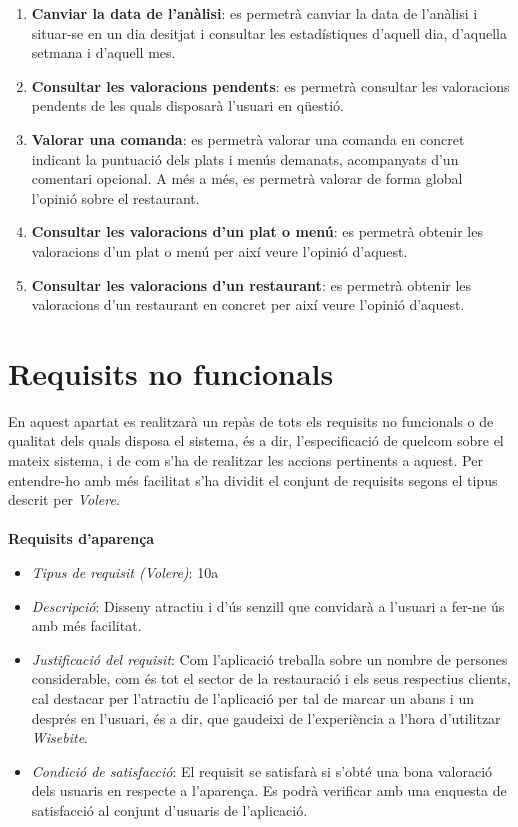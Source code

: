 \begin{enumerate}
\item \textbf{Canviar la data de l'anàlisi}: es permetrà canviar la data de l'anàlisi i situar-se en un dia desitjat i consultar les estadístiques d'aquell dia, d'aquella setmana i d'aquell mes.
\item \textbf{Consultar les valoracions pendents}: es permetrà consultar les valoracions pendents de les quals disposarà l'usuari en qüestió.
\item \textbf{Valorar una comanda}: es permetrà valorar una comanda en concret indicant la puntuació dels plats i menús demanats, acompanyats d'un comentari opcional. A més a més, es permetrà valorar de forma global l'opinió sobre el restaurant.
\item \textbf{Consultar les valoracions d'un plat o menú}: es permetrà obtenir les valoracions d'un plat o menú per així veure l'opinió d'aquest.
\item \textbf{Consultar les valoracions d'un restaurant}: es permetrà obtenir les valoracions d'un restaurant en concret per així veure l'opinió d'aquest.
\end{enumerate}
\newpage


\section{Requisits no funcionals}

En aquest apartat es realitzarà un repàs de tots els requisits no funcionals\cite{requisito} o de qualitat dels quals disposa el sistema, és a dir, l'especificació de quelcom sobre el mateix sistema, i de com s'ha de realitzar les accions pertinents a aquest. Per entendre-ho amb més facilitat s'ha dividit el conjunt de requisits segons el tipus descrit per \textit{Volere}\cite{volere}.
\\\\
\noindent\textbf{Requisits d'aparença}
\begin{itemize}
\item \textit{Tipus de requisit (Volere)}: 10a
\item \textit{Descripció}: Disseny atractiu i d'ús senzill que convidarà a l'usuari a fer-ne ús amb més facilitat.
\item \textit{Justificació del requisit}: Com l'aplicació treballa sobre un nombre de persones considerable, com és tot el sector de la restauració i els seus respectius clients, cal destacar per l'atractiu de l'aplicació per tal de marcar un abans i un després en l'usuari, és a dir, que gaudeixi de l'experiència a l'hora d'utilitzar \textit{Wisebite}.
\item \textit{Condició de satisfacció}: El requisit se satisfarà si s'obté una bona valoració dels usuaris en respecte a l'aparença. Es podrà verificar amb una enquesta de satisfacció al conjunt d'usuaris de l'aplicació.
\end{itemize}

